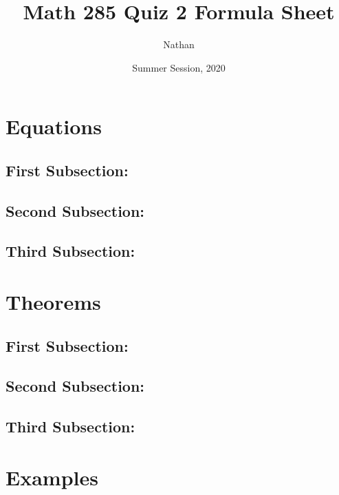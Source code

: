 \documentclass{article}
\title{Math 285 Quiz 2 Formula Sheet}
\author{Nathan}
\date{Summer Session, 2020}
\begin{document}
\maketitle

\section*{Equations}

\subsection*{First Subsection:}
\setcounter{equation}{0}



\subsection*{Second Subsection:}
\setcounter{equation}{0}



\subsection*{Third Subsection:}
\setcounter{equation}{0}





\section*{Theorems}

\subsection*{First Subsection:}
\setcounter{equation}{0}



\subsection*{Second Subsection:}
\setcounter{equation}{0}



\subsection*{Third Subsection:}
\setcounter{equation}{0}





\section*{Examples}
\end{document}
